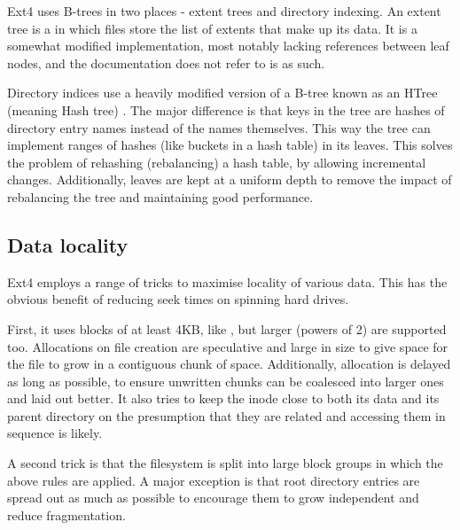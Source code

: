            Ext4 uses B-trees in two places - extent trees \cite{ext4_docs} and
            directory indexing. An extent tree is a \bplustree in which files
            store the list of extents that make up its data. It is a somewhat
            modified implementation, most notably lacking references between
            leaf nodes, and the documentation does not refer to is as such.

            Directory indices use a heavily modified version of a B-tree known
            as an HTree (meaning Hash tree) \cite{HTree}. The major difference
            is that keys in the tree are hashes of directory entry names
            instead of the names themselves. This way the tree can implement
            ranges of hashes (like buckets in a hash table) in its leaves. This
            solves the problem of rehashing (rebalancing) a hash table, by
            allowing incremental changes. Additionally, leaves are kept at a
            uniform depth to remove the impact of rebalancing the tree and
            maintaining good performance.

        \subsection{Data locality}
            \label{sec:locality}

            Ext4 employs a range of tricks to maximise locality of various
            data. This has the obvious benefit of reducing seek times on
            spinning hard drives.

            First, it uses blocks of at least 4KB, like ,
            but larger (powers of 2) are supported too. Allocations on file
            creation are speculative and large in size to give space for the
            file to grow in a contiguous chunk of space. Additionally,
            allocation is delayed as long as possible, to ensure unwritten
            chunks can be coalesced into larger ones and laid out better. It
            also tries to keep the inode close to both its data and its parent
            directory on the presumption that they are related and accessing
            them in sequence is likely.

            A second trick is that the filesystem is split into large block
            groups in which the above rules are applied. A major exception is
            that root directory entries are spread out as much as possible to
            encourage them to grow independent and reduce fragmentation.

